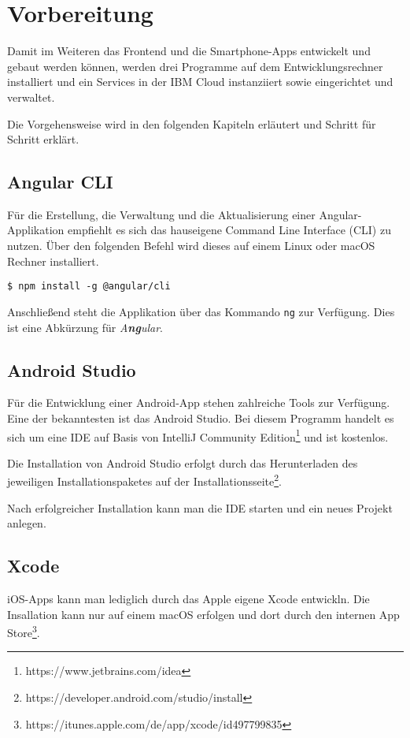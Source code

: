 \section{Vorbereitung}
Damit im Weiteren das Frontend und die Smartphone-Apps entwickelt und gebaut werden können, werden drei Programme auf
dem Entwicklungsrechner installiert und ein Services in der IBM Cloud instanziiert sowie eingerichtet und verwaltet.

Die Vorgehensweise wird in den folgenden Kapiteln erläutert und Schritt für Schritt erklärt.

\subsection{Angular CLI}
Für die Erstellung, die Verwaltung und die Aktualisierung einer Angular-Applikation empfiehlt es sich das hauseigene
Command Line Interface (CLI) zu nutzen. Über den folgenden Befehl wird dieses auf einem Linux oder macOS Rechner
installiert.

\begin{lstlisting}[caption=Installation des Angular CLI, label=ls:vorbereitung_angularcli]
    $ npm install -g @angular/cli
\end{lstlisting}

Anschließend steht die Applikation über das Kommando \texttt{ng} zur Verfügung. Dies ist eine Abkürzung für
\textit{A\textbf{ng}ular}.

\subsection{Android Studio}
Für die Entwicklung einer Android-App stehen zahlreiche Tools zur Verfügung. Eine der bekanntesten ist das Android
Studio. Bei diesem Programm handelt es sich um eine IDE auf Basis von IntelliJ Community
Edition\footnote{https://www.jetbrains.com/idea} und ist kostenlos.

Die Installation von Android Studio erfolgt durch das Herunterladen des jeweiligen Installationspaketes auf der
Installationsseite\footnote{https://developer.android.com/studio/install}.

Nach erfolgreicher Installation kann man die IDE starten und ein neues Projekt anlegen.

\subsection{Xcode}
iOS-Apps kann man lediglich durch das Apple eigene Xcode entwickln. Die Insallation kann nur auf einem macOS
erfolgen und dort durch den internen App Store\footnote{https://itunes.apple.com/de/app/xcode/id497799835}.

